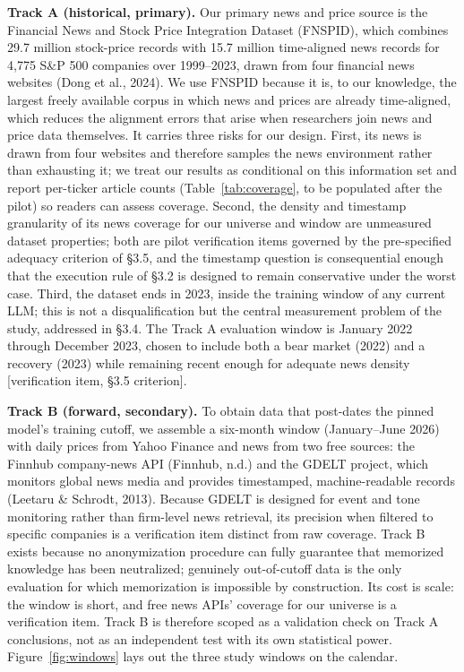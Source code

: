 \documentclass[
  12pt,
]{article}
\begin{document}
\textbf{Track A (historical, primary).} Our primary news and price
source is the Financial News and Stock Price Integration Dataset
(FNSPID), which combines 29.7 million stock-price records with 15.7
million time-aligned news records for 4,775 S\&P 500 companies over
1999--2023, drawn from four financial news websites (Dong et al., 2024).
We use FNSPID because it is, to our knowledge, the largest freely
available corpus in which news and prices are already time-aligned,
which reduces the alignment errors that arise when researchers join news
and price data themselves. It carries three risks for our design. First,
its news is drawn from four websites and therefore samples the news
environment rather than exhausting it; we treat our results as
conditional on this information set and report per-ticker article counts
(Table~\ref{tab:coverage}, to be populated after the pilot) so readers can assess coverage. Second, the density and
timestamp granularity of its news coverage for our universe and window
are unmeasured dataset properties; both are pilot verification items
governed by the pre-specified adequacy criterion of §3.5, and the
timestamp question is consequential enough that the execution rule of
§3.2 is designed to remain conservative under the worst case. Third, the
dataset ends in 2023, inside the training window of any current LLM;
this is not a disqualification but the central measurement problem of
the study, addressed in §3.4. The Track A evaluation window is January
2022 through December 2023, chosen to include both a bear market (2022)
and a recovery (2023) while remaining recent enough for adequate news
density {[}verification item, §3.5 criterion{]}.

\begin{table}[H]
\centering
{}
\caption{Universe and news-coverage statistics: per-ticker article counts and M1/M2 density metrics (placeholder; to be populated after the pilot).}
\label{tab:coverage}
\end{table}



\textbf{Track B (forward, secondary).} To obtain data that post-dates
the pinned model's training cutoff, we assemble a six-month window
(January--June 2026) with daily prices from Yahoo Finance and news from
two free sources: the Finnhub company-news API (Finnhub, n.d.) and the
GDELT project, which monitors global news media and provides
timestamped, machine-readable records (Leetaru \& Schrodt, 2013).
Because GDELT is designed for event and tone monitoring rather than
firm-level news retrieval, its precision when filtered to specific
companies is a verification item distinct from raw coverage. Track B
exists because no anonymization procedure can fully guarantee that
memorized knowledge has been neutralized; genuinely out-of-cutoff data
is the only evaluation for which memorization is impossible by
construction. Its cost is scale: the window is short, and free news
APIs' coverage for our universe is a verification item. Track B is
therefore scoped as a validation check on Track A conclusions, not as an
independent test with its own statistical power. Figure~\ref{fig:windows} lays out the three study windows on the calendar.
\end{document}
